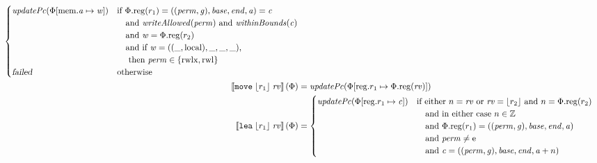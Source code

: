 \documentclass[a4paper]{article}
\newcommand{\update}[2]{[#1 \mapsto #2]}
\newcommand{\sem}[1]{\left\llbracket #1 \right\rrbracket}
\newcommand{\var}[1]{\mathit{#1}}
\newcommand{\rv}{\var{rv}}
\newcommand{\gl}{\var{g}}
\newcommand{\addr}{\var{a}}
\newcommand{\start}{\var{base}}
\newcommand{\addrend}{\var{end}}
\newcommand{\perm}{\var{perm}}
\newcommand{\stdcap}[1][(\perm,\gl)]{\left(#1,\start,\addrend,\addr \right)}
\newcommand{\plainproj}[1]{\mathrm{#1}}
\newcommand{\memreg}[1][\Phi]{#1.\plainproj{reg}}
\newcommand{\updateHeap}[3][\Phi]{#1\update{\plainproj{mem}.#2}{#3}}
\newcommand{\updateReg}[3][\Phi]{#1\update{\plainproj{reg}.#2}{#3}}
\newcommand{\failed}{\textsl{failed}}
\newcommand{\plainfun}[2]{
  \ifthenelse{\equal{#2}{}}
  {\mathit{#1}}
  {\mathit{#1}(#2)}
}
\newcommand{\writeAllowed}[1]{\plainfun{writeAllowed}{#1}}
\newcommand{\withinBounds}[1]{\plainfun{withinBounds}{#1}}
\newcommand{\stdUpdatePc}[1]{\plainfun{updatePc}{#1}}
\newcommand{\ints}{\mathbb{Z}}
\newcommand{\refreg}[1]{\lfloor #1 \rfloor}
\newcommand{\zinstr}[1]{\mathtt{#1}}
\newcommand{\twoinstr}[3]{\zinstr{#1} \; #2 \; #3}
\newcommand{\move}[2]{\twoinstr{move}{#1}{#2}}
\newcommand{\lea}[2]{\twoinstr{lea}{#1}{#2}}
\newcommand{\plainperm}[1]{\mathrm{#1}}
\newcommand{\entry}{\plainperm{e}}
\newcommand{\readwritel}{\plainperm{rwl}}
\newcommand{\rwlx}{\plainperm{rwlx}}
\newcommand{\local}{\plainperm{local}}
\begin{document}
\begin{align*}
                                              \begin{cases}
                                                \stdUpdatePc{\updateHeap{\addr}{\var{w}}} &
                                                \arraycolsep=0pt
                                                \begin{array}[t]{l}
                                                  \text{if }\memreg(r_1) = \stdcap = \var{c} \\
                                                  \quad\text{and }\writeAllowed{\perm} \text{ and } \withinBounds{\var{c}} \\
                                                  \quad\text{and }\var{w} = \memreg(r_2)\\
                                                  \quad\text{and if } \var{w} = ((\_,\local),\_,\_,\_) \text{,} \\
                                                  \quad\text{ then } \perm \in \{\rwlx,\readwritel \}
                                                \end{array}\\
                                                \failed & \text{otherwise }
                                              \end{cases}\\
  \sem{\move{\refreg{r_1}}{\rv}}(\Phi)            & = \stdUpdatePc{\updateReg{r_1}{\memreg(\rv)}}
  \\
  \sem{\lea{\refreg{r_1}}{\rv}}(\Phi)            & =
                                             \begin{cases}
                                               \stdUpdatePc{\updateReg{r_1}{\var{c}}} &
                                               \arraycolsep=0pt
                                               \begin{array}[t]{l}
                                                 \text{if either $n = \rv$ or $\rv = \refreg{r_2}$ and $n = \memreg(r_2)$} \\
                                                 \quad\text{and in either case $n \in \ints $} \\
                                                 \quad\text{and $\memreg(r_1) = \stdcap$}\\
                                                 \quad\text{and $\perm \neq \entry$}\\
                                                 \quad\text{and $\var{c} = ((\perm,\gl),\start,\addrend,\addr + n)$}

\end{array}
\end{cases}
\end{align*}
\end{document}
